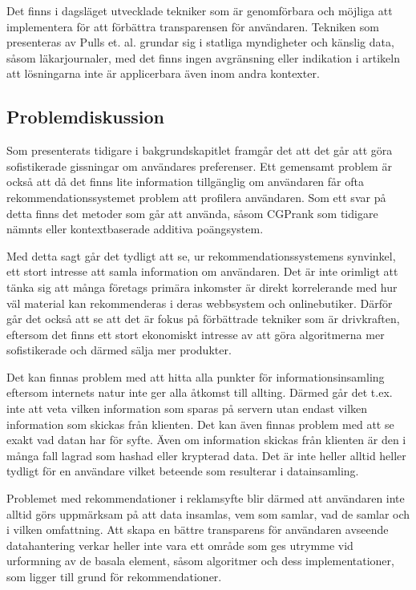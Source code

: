 \documentclass[a4paper,11pt]{article}
\begin{document}
{Det finns i dagsläget utvecklade tekniker som är genomförbara och möjliga att implementera för att förbättra transparensen för användaren. Tekniken som presenteras av Pulls et. al. \cite{?} grundar sig i statliga myndigheter och känslig data, såsom läkarjournaler, med det finns ingen avgränsning eller indikation i artikeln att lösningarna inte är applicerbara även inom andra kontexter. 

\subsection{Problemdiskussion}
Som presenterats tidigare i bakgrundskapitlet framgår det att det går att göra sofistikerade gissningar om användares preferenser. Ett gemensamt problem är också att då det finns lite information tillgänglig om användaren får ofta rekommendationssystemet problem att profilera användaren. Som ett svar på detta finns det metoder som går att använda, såsom CGPrank som tidigare nämnts eller kontextbaserade additiva poängsystem. 

Med detta sagt går det tydligt att se, ur rekommendationssystemens synvinkel, ett stort intresse att samla information om användaren. Det är inte orimligt att tänka sig att många företags primära inkomster är direkt korrelerande med hur väl material kan rekommenderas i deras webbsystem och onlinebutiker. Därför går det också att se att det är fokus på förbättrade tekniker som är drivkraften, eftersom det finns ett stort ekonomiskt intresse av att göra algoritmerna mer sofistikerade och därmed sälja mer produkter. 

Det kan finnas problem med att hitta alla punkter för informationsinsamling eftersom internets natur inte ger alla åtkomst till allting. Därmed går det t.ex. inte att veta vilken information som sparas på servern utan endast vilken information som skickas från klienten. Det kan även finnas problem med att se exakt vad datan har för syfte. Även om information skickas från klienten är den i många fall lagrad som hashad eller krypterad data. Det är inte heller alltid heller tydligt för en användare vilket beteende som resulterar i datainsamling. 

Problemet med rekommendationer i reklamsyfte blir därmed att användaren inte alltid görs uppmärksam på att data insamlas, vem som samlar, vad de samlar och i vilken omfattning. Att skapa en bättre transparens för användaren avseende datahantering verkar heller inte vara ett område som ges utrymme vid urformning av de basala element, såsom algoritmer och dess implementationer, som ligger till grund för rekommendationer. 

}
\end{document}
